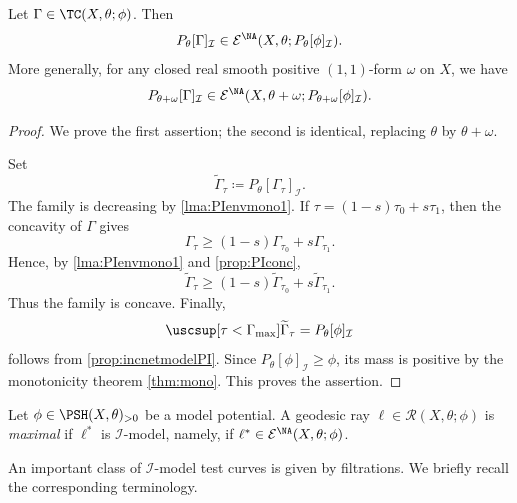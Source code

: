 \begin{proposition}\label{prop:transitionPI}
    Let $\Gamma\in \TC(X,\theta;\phi)$. Then
    \[
        P_{\theta}[\Gamma]_{\mathcal{I}}\in \mathcal{E}^{\NA}(X,\theta;P_{\theta}[\phi]_{\mathcal{I}}).
    \]
    More generally, for any closed real smooth positive $(1,1)$-form $\omega$ on $X$, we have
    \[
        P_{\theta+\omega}[\Gamma]_{\mathcal{I}}\in \mathcal{E}^{\NA}(X,\theta+\omega;P_{\theta+\omega}[\phi]_{\mathcal{I}}).
    \]
\end{proposition}
\begin{proof}
     We prove the first assertion; the second is identical, replacing $\theta$ by $\theta+\omega$.

    Set
    \[
        \widetilde\Gamma_\tau
        \coloneqq P_\theta[\Gamma_\tau]_{\mathcal I}.
    \]
    The family is decreasing by \cref{lma:PIenvmono1}. If $\tau=(1-s)\tau_0+s\tau_1$, then the concavity of $\Gamma$ gives
    \[
        \Gamma_\tau\geq (1-s)\Gamma_{\tau_0}+s\Gamma_{\tau_1}.
    \]
    Hence, by \cref{lma:PIenvmono1} and \cref{prop:PIconc},
    \[
        \widetilde\Gamma_\tau \geq (1-s)\widetilde\Gamma_{\tau_0}+s\widetilde\Gamma_{\tau_1}.
    \]
    Thus the family is concave. Finally,
    \[
        \uscsup[\tau<\Gamma_{\max}]\widetilde\Gamma_\tau = P_\theta[\phi]_{\mathcal I}
    \]
    follows from \cref{prop:incnetmodelPI}. Since
    $P_\theta[\phi]_{\mathcal I}\geq\phi$, its mass is positive by the monotonicity theorem \cref{thm:mono}. This proves the assertion.
\end{proof}

\begin{definition}\label{def:maximalgeoray}
    Let $\phi\in \PSH(X,\theta)_{>0}$ be a model potential.
    A geodesic ray $\ell\in \mathcal{R}(X,\theta;\phi)$ is \emph{maximal} if $\ell^*$ is $\mathcal{I}$-model, namely, if $\ell^*\in\mathcal E^{\NA}(X,\theta;\phi)$.
\end{definition}

An important class of $\mathcal{I}$-model test curves is given by filtrations. We briefly recall the corresponding terminology.

